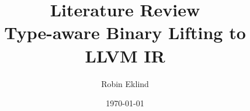 \documentclass{kththesis}
\title{Literature Review \\ \Large{Type-aware Binary Lifting to LLVM IR}}
\author{Robin Eklind}
\date{\today}
\begin{document}


\frontmatter


\titlepage


\clearpage


%


\tableofcontents



%
%
%


\mainmatter










\tailmatter
\end{document}
